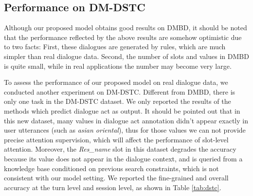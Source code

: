\subsection{Performance on DM-DSTC}
\label{sec:per-dm-dstc}
Although our proposed model obtains good results on DMBD, it should be noted that the performance reflected by the above results are somehow optimistic due to two facts: First, these dialogues are generated by rules, which are much simpler than real dialogue data. Second, the number of slots and values in DMBD is quite small, while in real applications the number may become very large.

To assess the performance of our proposed model on real dialogue data, we conducted another experiment on DM-DSTC. Different from DMBD, there is only one task in the DM-DSTC dataset. We only reported the results of the methods which predict dialogue act as output. It should be pointed out that in this new dataset, many values in dialogue act annotation didn't appear exactly in user utterances (such as {\em asian oriental}), thus for those values we can not provide precise attention supervision, which will affect the performance of slot-level attention. 
Moreover, the {\em Res\_name} slot in this dataset degrades the accuracy because its value does not appear in the dialogue context, and is queried from a knowledge base conditioned on previous search constraints, which is not consistent with our model setting. We reported the fine-grained and overall accuracy at the turn level and session level, as shown in Table \ref{tab:dstc}.



